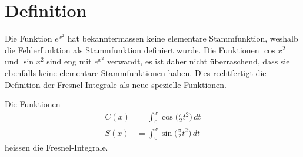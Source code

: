 %
%
%
\section{Definition\label{fresnel:section:teil0}}
Die Funktion $e^{x^2}$ hat bekanntermassen keine elementare Stammfunktion,
weshalb die Fehlerfunktion als Stammfunktion definiert wurde.
Die Funktionen $\cos x^2$ und $\sin x^2$ sind eng mit $e^{x^2}$
verwandt, es ist daher nicht überraschend, dass sie ebenfalls
keine elementare Stammfunktionen haben.
Dies rechtfertigt die Definition der Fresnel-Integrale als neue spezielle
Funktionen.

\begin{definition}
Die Funktionen 
\begin{align*}
C(x) &= \int_0^x \cos\biggl(\frac{\pi}2 t^2\biggr)\,dt
\\
S(x) &= \int_0^x \sin\biggl(\frac{\pi}2 t^2\biggr)\,dt
\end{align*}
heissen die Fresnel-Integrale.
\end{definition}

